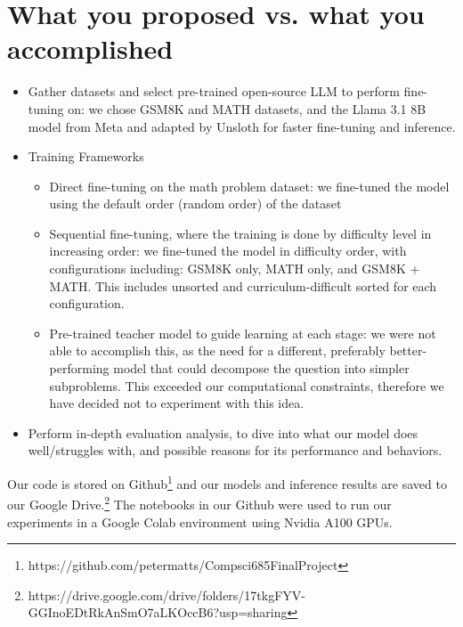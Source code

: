 \section{What you proposed vs. what you accomplished}

\begin{itemize}
\item \cmark\; Gather datasets and select pre-trained open-source LLM to perform fine-tuning on: we chose GSM8K and MATH datasets, and the Llama 3.1 8B model from Meta and adapted by Unsloth for faster fine-tuning and inference.

\item Training Frameworks
\begin{itemize}
    \item \cmark\; Direct fine-tuning on the math problem dataset: we fine-tuned the model using the default order (random order) of the dataset
    \item \cmark\; Sequential fine-tuning, where the training is done by difficulty level in increasing order: we fine-tuned the model in difficulty order, with configurations including: GSM8K only, MATH only, and GSM8K + MATH. This includes unsorted and curriculum-difficult sorted for each configuration.
    \item \xmark\; Pre-trained teacher model to guide learning at each stage: we were not able to accomplish this, as the need for a different, preferably better-performing model that could decompose the question into simpler subproblems. This exceeded our computational constraints, therefore we have decided not to experiment with this idea.
\end{itemize}
\item \cmark\; Perform in-depth evaluation analysis, to dive into what our model does well/struggles with, and possible reasons for its performance and behaviors.
\end{itemize}

Our code is stored on Github\footnote{https://github.com/petermatts/Compsci685FinalProject} and our models and inference results are saved to our Google Drive.\footnote{https://drive.google.com/drive/folders/17tkgFYV-GGInoEDtRkAnSmO7aLKOccB6?usp=sharing} The notebooks in our Github were used to run our experiments in a Google Colab environment using Nvidia A100 GPUs.
